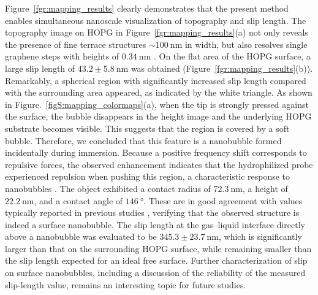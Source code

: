 \documentclass[journal=jacsat,manuscript=article]{achemso}
\begin{document}
Figure~\ref{fgr:mapping_results} clearly demonstrates that the present method enables simultaneous nanoscale visualization of topography and slip length. The topography image on HOPG in Figure~\ref{fgr:mapping_results}(a) not only reveals the presence of fine terrace structures \(\sim\SI{100}{\nano\metre}\) in width, but also resolves single graphene steps with heights of \(\SI{0.34}{\nano\metre}\) \cite{Franklin1951-hy}. On the flat area of the HOPG surface, a large slip length of \(43.2 \pm \SI{5.8}{\nano\metre}\) was obtained (Figure~\ref{fgr:mapping_results}(b)). Remarkably, a spherical region with significantly increased slip length compared with the surrounding area appeared, as indicated by the white triangle. As shown in Figure.~\ref{figS:mapping_colormaps}(a), when the tip is strongly pressed against the surface, the bubble disappears in the height image and the underlying HOPG substrate becomes visible. This suggests that the region is covered by a soft bubble. Therefore, we concluded that this feature is a nanobubble formed incidentally during immersion. Because a positive frequency shift corresponds to repulsive forces, the observed enhancement indicates that the hydrophilized probe experienced repulsion when pushing this region, a characteristic response to nanobubbles \cite{Teshima2018-cx, Teshima2020-vr}. The object exhibited a contact radius of \(\SI{72.3}{\nano\metre}\), a height of \(\SI{22.2}{\nano\metre}\), and a contact angle of \(\SI{146}{\degree}\). These are in good agreement with values typically reported in previous studies \cite{Zhang2014-ng, Wang2015-yj}, verifying that the observed structure is indeed a surface nanobubble. The slip length at the gas--liquid interface directly above a nanobubble was evaluated to be \(345.3 \pm \SI{23.7}{\nano\meter}\), which is significantly larger than that on the surrounding HOPG surface, while remaining smaller than the slip length expected for an ideal free surface. Further characterization of slip on surface nanobubbles, including a discussion of the reliability of the measured slip-length value, remains an interesting topic for future studies.
\end{document}
